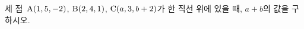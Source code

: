 세 점~$\mathrm{A}(1{,}\mkern3mu\mathopen{}5{,}\mkern3mu\mathopen{}-2)$, $\mathrm{B}(2{,}\mkern3mu\mathopen{}4{,}\mkern3mu\mathopen{}1)$, $\mathrm{C}(a{,}\mkern3mu\mathopen{}3{,}\mkern3mu\mathopen{}b+2)$가 한 직선 위에 있을 때, $a+b$의 값을 구하시오.
